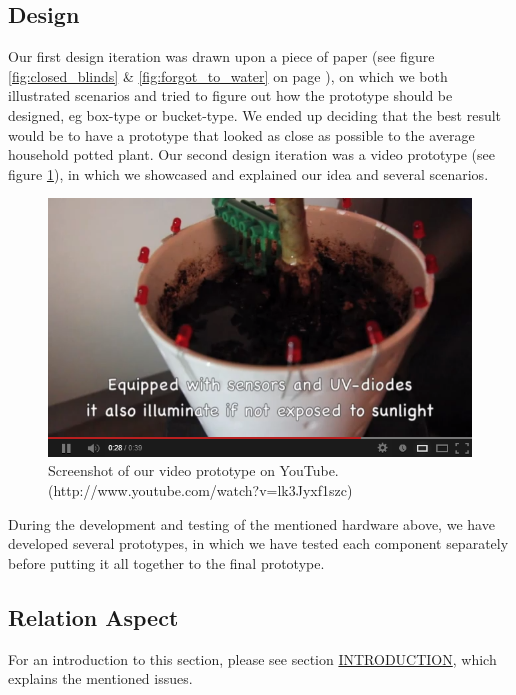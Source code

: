 \documentclass{ubicomp2012}
\begin{document}
\subsection{Design}
Our first design iteration was drawn upon a piece of paper (see figure \ref{fig:closed_blinds} \& \ref{fig:forgot_to_water} on page \pageref{fig:closed_blinds}), on which we both illustrated scenarios and tried to figure out how the prototype should be designed, eg box-type or bucket-type. We ended up deciding that the best result would be to have a prototype that looked as close as possible to the average household potted plant.
Our second design iteration was a video prototype (see figure \ref{fig:iPlant_youtube}), in which we showcased and explained our idea and several scenarios.
\begin{figure}[h!]
\centering
\includegraphics[width=\columnwidth]{iPlant_youtube.png}
\caption{Screenshot of our video prototype on YouTube. (http://www.youtube.com/watch?v=lk3Jyxf1szc)}
\label{fig:iPlant_youtube}
\end{figure}
During the development and testing of the mentioned hardware above, we have developed several prototypes, in which we have tested each component separately before putting it all together to the final prototype.


\subsection{Relation Aspect}
For an introduction to this section, please see section \hyperlink{introduction}{INTRODUCTION}, which explains the mentioned issues.
\end{document}
